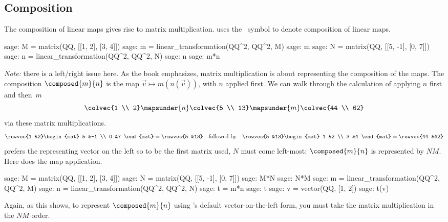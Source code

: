 \subsection{Composition}
The composition of linear maps gives rise to matrix multiplication.
\Sage{} uses the \inlinecode{*}~symbol to denote composition of linear maps.
\begin{sagecommandline}
sage: M = matrix(QQ, [[1, 2], [3, 4]])
sage: m = linear_transformation(QQ^2, QQ^2, M)
sage: m
sage: N = matrix(QQ, [[5, -1], [0, 7]])
sage: n = linear_transformation(QQ^2, QQ^2, N)
sage: n
sage: m*n
\end{sagecommandline}

\textit{Note:} there is a left/right issue here.
As the book emphasizes, matrix multiplication is about 
representing the composition of the maps.
The composition $\composed{m}{n}$ is the map $\vec{v}\mapsto m(n(\vec{v}))$, 
with $n$ applied first. 
We can walk through the calculation of applying $n$ first and then~$m$
\begin{equation*}
  \colvec{1 \\ 2}
   \mapsunder{n}
  \colvec{5 \\ 13}
   \mapsunder{m}
  \colvec{44 \\ 62}
\end{equation*}
via these matrix multiplications.
\begin{equation*}
  \rowvec{1 &2}
  \begin{mat}
    5 &-1 \\ 
    0 &7
  \end{mat}
  =\rowvec{5 &13}
  \quad\text{followed by}\quad
  \rowvec{5 &13}
  \begin{mat}
    1 &2 \\ 
    3 &4
  \end{mat}
  =\rowvec{44 &62}
\end{equation*}
\Sage{} prefers the representing vector on the left so to be the 
first matrix used, $N$ must come left-most: $\composed{m}{n}$ is represented 
by $NM$.
Here \Sage{} does the map application.
\begin{sagecommandline}
sage: M = matrix(QQ, [[1, 2], [3, 4]])
sage: N = matrix(QQ, [[5, -1], [0, 7]])
sage: M*N
sage: N*M
sage: m = linear_transformation(QQ^2, QQ^2, M)
sage: n = linear_transformation(QQ^2, QQ^2, N)
sage: t = m*n
sage: t
sage: v = vector(QQ, [1, 2])
sage: t(v)
\end{sagecommandline}
Again, as this shows,
to represent $\composed{m}{n}$ using
\Sage's default vector-on-the-left form, 
you must take the matrix multiplication in the $NM$ order. 


